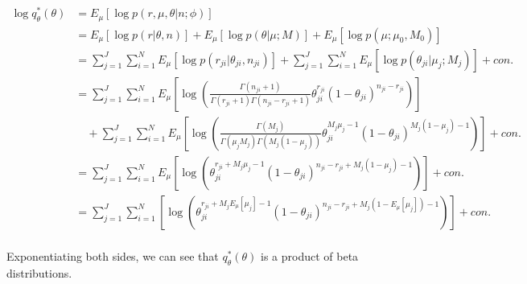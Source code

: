 \documentclass[11pt,reqno]{amsart}
\begin{document}
\begin{equation}
\begin{split}
\log q_\theta^*(\theta) &= E_\mu\left[ \log p\left(r,\mu,\theta | n; \phi \right) \right] \\
&= E_\mu \left[ \log p\left(r | \theta, n \right)\right] + E_\mu \left[ \log p\left(\theta | \mu; M \right)\right] + E_\mu \left[ \log p\left(\mu ; \mu_0, M_0 \right)\right] \\
&= \sum_{j=1}^{J} \sum_{i=1}^{N} E_\mu  \left[ \log p \left( r_{ji} | \theta_{ji}, n_{ji} \right) \right] + \sum_{j=1}^{J} \sum_{i=1}^{N} E_\mu \left[ \log p\left(\theta_{ji} | \mu_j; M_j \right)\right] +con. \\
&= \sum_{j=1}^{J} \sum_{i=1}^{N}  E_\mu  \left[ \log \left( \frac{ \Gamma(n_{ji}+1) } { \Gamma(r_{ji}+1) \Gamma( n_{ji} - r_{ji} + 1 ) } \theta_{ji}^{r_{ji}} (1 - \theta_{ji})^{n_{ji} - r_{ji}} \right) \right] \\
&\quad + \sum_{j=1}^{J} \sum_{i=1}^{N}  E_\mu  \left[ \log \left( \frac{ \Gamma(M_j) } { \Gamma(\mu_j M_j) \Gamma(M_j (1-\mu_j)) } \theta_{ji}^{M_j\mu_j -1} (1 - \theta_{ji})^{M_j ( 1 - \mu_j) - 1} \right) \right] +con.\\
&=  \sum_{j=1}^{J} \sum_{i=1}^{N} E_\mu\left[ \log \left( \theta_{ji}^{r_{ji} + M_j\mu_j -1} (1 - \theta_{ji})^{n_{ji} - r_{ji} + M_j ( 1 - \mu_j) - 1} \right) \right] +con. \\
&=   \sum_{j=1}^{J} \sum_{i=1}^{N} \left[ \log \left( \theta_{ji}^{r_{ji} + M_j E_\mu\left[ \mu_j\right] -1} (1 - \theta_{ji})^{n_{ji} - r_{ji} + M_j ( 1 - E_\mu\left[ \mu_j\right]) - 1} \right) \right] +con. \\
\end{split}
\end{equation}

Exponentiating both sides, we can see that  $ q_\theta^*(\theta) $ is a product of beta distributions.
\iffalse
\begin{align}
\theta_{ji} \thicksim \text{Binomial}(\alpha_{ji}, \beta_{ji})
\end{align}
where,
\begin{align}
\alpha_{ji} &= r_{ji} + M_j E_\mu\left[ \mu_j\right] -1 \nonumber \\
\beta_{ji} &= n_{ji} - r_{ji} + M_j ( 1 - E_\mu\left[ \mu_j\right]) \nonumber
\end{align}
\fi
\end{document}
